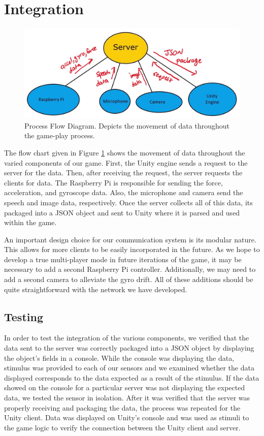 \documentclass[titlepage, 12pt]{scrartcl}
\begin{document}
\section{Integration}
    \begin{figure}
        \centering
        \includegraphics[scale=0.2]{figures/flow_chart.jpg}
        \caption{Process Flow Diagram. Depicts the movement of data throughout the game-play process.}
        \label{fig:flow_chart}
    \end{figure}
    The flow chart given in Figure \ref{fig:flow_chart} shows the movement of data throughout the varied components of our game. First, the Unity engine sends a request to the server for the data. Then, after receiving the request, the server requests the clients for data. The Raspberry Pi is responsible for sending the force, acceleration, and gyroscope data. Also, the microphone and camera send the speech and image data, respectively. Once the server collects all of this data, its packaged into a JSON object and sent to Unity where it is parsed and used within the game. \par
    An important design choice for our communication system is its modular nature. This allows for more clients to be easily incorporated in the future. As we hope to develop a true multi-player mode in future iterations of the game, it may be necessary to add a second Raspberry Pi controller. Additionally, we may need to add a second camera to alleviate the gyro drift. All of these additions should be quite straightforward with the network we have developed.
    \subsection{Testing}
    In order to test the integration of the various components, we verified that the data sent to the server was correctly packaged into a JSON object by displaying the object's fields in a console. While the console was displaying the data, stimulus was provided to each of our sensors and we examined whether the data displayed corresponds to the data expected as a result of the stimulus. If the data showed on the console for a particular server was not displaying the expected data, we tested the sensor in isolation. After it was verified that the server was properly receiving and packaging the data, the process was repeated for the Unity client. Data was displayed on Unity's console and was used as stimuli to the game logic to verify the connection between the Unity client and server. 
\end{document}
